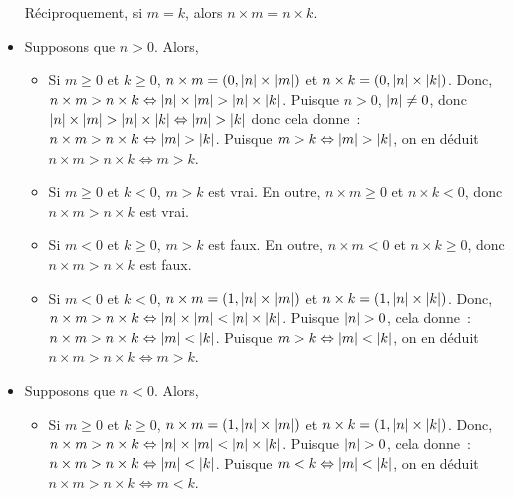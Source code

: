\begin{itemize}[nosep]
            Réciproquement, si $m = k$, alors $n \times m = n \times k$.
        \item Supposons que $n > 0$.
            Alors, 
            \begin{itemize}[nosep]
                \item Si $m \geq 0$ et $k \geq 0$, $n \times m = (0, \left\lvert n \right\rvert \times \left\lvert m \right\rvert)$ et $n \times k = (0, \left\lvert n \right\rvert \times \left\lvert k \right\rvert)$.
                    Donc, $n \times m > n \times k \Leftrightarrow \left\lvert n \right\rvert \times \left\lvert m \right\rvert > \left\lvert n \right\rvert \times \left\lvert k \right\rvert$.
                    Puisque $n > 0$, $\left\lvert n \right\rvert \neq 0$, donc $\left\lvert n \right\rvert \times \left\lvert m \right\rvert > \left\lvert n \right\rvert \times \left\lvert k \right\rvert \Leftrightarrow \left\lvert m \right\rvert > \left\lvert k \right\rvert$ donc cela donne : $n \times m > n \times k \Leftrightarrow \left\lvert m \right\rvert > \left\lvert k \right\rvert$. 
                    Puisque $m > k \Leftrightarrow \left\lvert m \right\rvert > \left\lvert k \right\rvert$, on en déduit $n \times m > n \times k \Leftrightarrow m > k$.
                \item Si $m \geq 0$ et $k < 0$, $m > k$ est vrai.
                    En outre, $n \times m \geq 0$ et $n \times k < 0$, donc $n \times m > n \times k$ est vrai.
                \item Si $m < 0$ et $k \geq 0$, $m > k$ est faux.
                    En outre, $n \times m < 0$ et $n \times k \geq 0$, donc $n \times m > n \times k$ est faux.
                \item Si $m < 0$ et $k < 0$, $n \times m = (1, \left\lvert n \right\rvert \times \left\lvert m \right\rvert)$ et $n \times k = (1, \left\lvert n \right\rvert \times \left\lvert k \right\rvert)$.
                    Donc, $n \times m > n \times k \Leftrightarrow \left\lvert n \right\rvert \times \left\lvert m \right\rvert < \left\lvert n \right\rvert \times \left\lvert k \right\rvert$.
                    Puisque $\left\lvert n \right\rvert > 0$, cela donne : $n \times m > n \times k \Leftrightarrow \left\lvert m \right\rvert < \left\lvert k \right\rvert$. 
                    Puisque $m > k \Leftrightarrow \left\lvert m \right\rvert < \left\lvert k \right\rvert$, on en déduit $n \times m > n \times k \Leftrightarrow m > k$.
            \end{itemize}
        \item Supposons que $n < 0$.
            Alors, 
            \begin{itemize}[nosep]
                \item Si $m \geq 0$ et $k \geq 0$, $n \times m = (1, \left\lvert n \right\rvert \times \left\lvert m \right\rvert)$ et $n \times k = (1, \left\lvert n \right\rvert \times \left\lvert k \right\rvert)$.
                    Donc, $n \times m > n \times k \Leftrightarrow \left\lvert n \right\rvert \times \left\lvert m \right\rvert < \left\lvert n \right\rvert \times \left\lvert k \right\rvert$.
                    Puisque $\left\lvert n \right\rvert > 0$, cela donne : $n \times m > n \times k \Leftrightarrow \left\lvert m \right\rvert < \left\lvert k \right\rvert$. 
                    Puisque $m < k \Leftrightarrow \left\lvert m \right\rvert < \left\lvert k \right\rvert$, on en déduit $n \times m > n \times k \Leftrightarrow m < k$.

\end{itemize}
\end{itemize}
